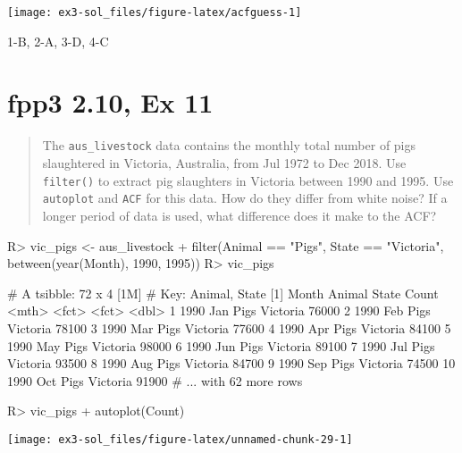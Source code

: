 \documentclass[
]{article}
\begin{document}
\begin{CodeChunk}


\begin{center}\texttt{[image: ex3-sol\_files/figure-latex/acfguess-1]} \end{center}

\end{CodeChunk}

1-B, 2-A, 3-D, 4-C

\hypertarget{fpp3-2.10-ex-11}{%
\section{fpp3 2.10, Ex 11}\label{fpp3-2.10-ex-11}}

\begin{quote}
The \texttt{aus\_livestock} data contains the monthly total number of pigs slaughtered in Victoria, Australia, from Jul 1972 to Dec 2018. Use \texttt{filter()} to extract pig slaughters in Victoria between 1990 and 1995. Use \texttt{autoplot} and \texttt{ACF} for this data. How do they differ from white noise? If a longer period of data is used, what difference does it make to the ACF?
\end{quote}

\begin{CodeChunk}
\begin{CodeInput}
R> vic_pigs <- aus_livestock %
+   filter(Animal == "Pigs", State == "Victoria", between(year(Month), 1990, 1995))
R> vic_pigs
\end{CodeInput}
\begin{CodeOutput}
# A tsibble: 72 x 4 [1M]
# Key:       Animal, State [1]
      Month Animal State    Count
      <mth> <fct>  <fct>    <dbl>
 1 1990 Jan Pigs   Victoria 76000
 2 1990 Feb Pigs   Victoria 78100
 3 1990 Mar Pigs   Victoria 77600
 4 1990 Apr Pigs   Victoria 84100
 5 1990 May Pigs   Victoria 98000
 6 1990 Jun Pigs   Victoria 89100
 7 1990 Jul Pigs   Victoria 93500
 8 1990 Aug Pigs   Victoria 84700
 9 1990 Sep Pigs   Victoria 74500
10 1990 Oct Pigs   Victoria 91900
# ... with 62 more rows
\end{CodeOutput}
\end{CodeChunk}

\begin{CodeChunk}
\begin{CodeInput}
R> vic_pigs %
+   autoplot(Count)
\end{CodeInput}


\begin{center}\texttt{[image: ex3-sol\_files/figure-latex/unnamed-chunk-29-1]} \end{center}

\end{CodeChunk}
\end{document}
